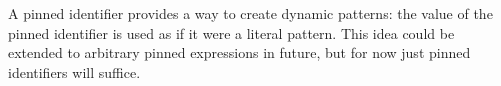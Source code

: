 A pinned identifier provides a way to create dynamic patterns: the value of the
pinned identifier is used as if it were a literal pattern. This idea could be
extended to arbitrary pinned expressions in future, but for now just pinned
identifiers will suffice.

\begin{bnf*}
\end{bnf*}

\begin{prooftree}
\end{prooftree}

